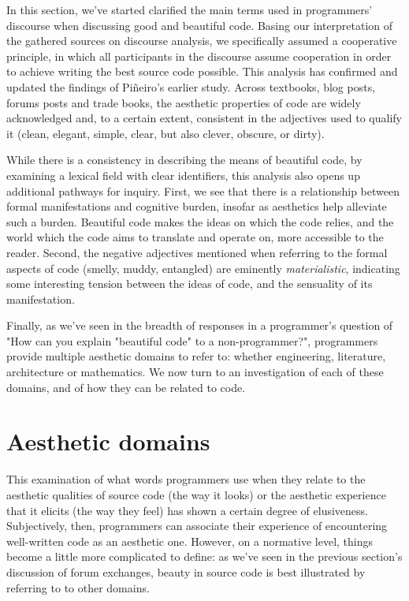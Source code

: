 In this section, we've started clarified the main terms used in programmers' discourse when discussing good and beautiful code. Basing our interpretation of the gathered sources on discourse analysis, we specifically assumed a cooperative principle, in which all participants in the discourse assume cooperation in order to achieve writing the best source code possible. This analysis has confirmed and updated the findings of Piñeiro's earlier study. Across textbooks, blog posts, forums posts and trade books, the aesthetic properties of code are widely acknowledged and, to a certain extent, consistent in the adjectives used to qualify it (clean, elegant, simple, clear, but also clever, obscure, or dirty).

While there is a consistency in describing the means of beautiful code, by examining a lexical field with clear identifiers, this analysis also opens up additional pathways for inquiry. First, we see that there is a relationship between formal manifestations and cognitive burden, insofar as aesthetics help alleviate such a burden. Beautiful code makes the ideas on which the code relies, and the world which the code aims to translate and operate on, more accessible to the reader. Second, the negative adjectives mentioned when referring to the formal aspects of code (smelly, muddy, entangled) are eminently \emph{materialistic}, indicating some interesting tension between the ideas of code, and the sensuality of its manifestation.

Finally, as we've seen in the breadth of responses in a programmer's question of "How can you explain "beautiful code" to a non-programmer?"\cite{how_2013a}, programmers provide multiple aesthetic domains to refer to: whether engineering, literature, architecture or mathematics. We now turn to an investigation of each of these domains, and of how they can be related to code.

\pagebreak

\section{Aesthetic domains}

This examination of what words programmers use when they relate to the aesthetic qualities  of source code (the way it looks) or the aesthetic experience that it elicits (the way they feel) has shown a certain degree of elusiveness. Subjectively, then, programmers can associate their experience of encountering well-written code as an aesthetic one. However, on a normative level, things become a little more complicated to define: as we've seen in the previous section's discussion of forum exchanges, beauty in source code is best illustrated by referring to to other domains.

